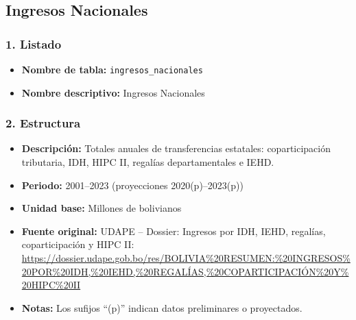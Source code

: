 \documentclass[12pt,a4paper]{article}
\begin{document}
\subsection{Ingresos Nacionales}

\subsubsection*{1. Listado}
\begin{itemize}
  \item \textbf{Nombre de tabla:} \texttt{ingresos\_nacionales}
  \item \textbf{Nombre descriptivo:} Ingresos Nacionales
\end{itemize}

\subsubsection*{2. Estructura}
\begin{itemize}
  \item \textbf{Descripción:} Totales anuales de transferencias estatales: coparticipación tributaria, IDH, HIPC II, regalías departamentales e IEHD.
  \item \textbf{Periodo:} 2001–2023 (proyecciones 2020(p)–2023(p))
  \item \textbf{Unidad base:} Millones de bolivianos
  \item \textbf{Fuente original:} UDAPE – Dossier: Ingresos por IDH, IEHD, regalías, coparticipación y HIPC II:\\
    \url{https://dossier.udape.gob.bo/res/BOLIVIA%20RESUMEN:%20INGRESOS%20POR%20IDH,%20IEHD,%20REGALÍAS,%20COPARTICIPACIÓN%20Y%20HIPC%20II}
  \item \textbf{Notas:} Los sufijos “(p)” indican datos preliminares o proyectados.
\end{itemize}
\end{document}
